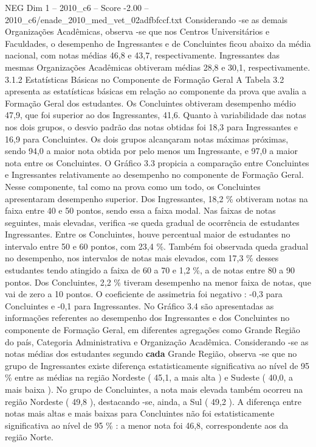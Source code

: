 \begin{textsample}{NEG Dim 1 – 2010\_c6 – Score -2.00 – 2010\_c6/enade\_2010\_med\_vet\_02adfbfccf.txt}
Considerando -se as demais Organizações Acadêmicas, observa -se que nos Centros Universitários e Faculdades, o desempenho de Ingressantes e de Concluintes ficou abaixo da média nacional, com notas médias 46,8 e 43,7, respectivamente.
Ingressantes das mesmas Organizações Acadêmicas obtiveram médias 28,8 e 30,1, respectivamente. 3.1.2 Estatísticas Básicas no Componente de Formação Geral A Tabela 3.2 apresenta as estatísticas básicas em relação ao componente da prova que avalia a Formação Geral dos estudantes.
Os Concluintes obtiveram desempenho médio 47,9, que foi superior ao dos Ingressantes, 41,6.
Quanto à variabilidade das notas nos dois grupos, o desvio padrão das notas obtidas foi 18,3 para Ingressantes e 16,9 para Concluintes.
Os dois grupos alcançaram notas máximas próximas, sendo 94,0 a maior nota obtida por pelo menos um Ingressante, e 97,0 a maior nota entre os Concluintes.
O Gráfico 3.3 propicia a comparação entre Concluintes e Ingressantes relativamente ao desempenho no componente de Formação Geral.
Nesse componente, tal como na prova como um todo, os Concluintes apresentaram desempenho superior.
Dos Ingressantes, 18,2 \% obtiveram notas na faixa entre 40 e 50 pontos, sendo essa a faixa modal.
Nas faixas de notas seguintes, mais elevadas, verifica -se queda gradual de ocorrência de estudantes Ingressantes.
Entre os Concluintes, houve percentual maior de estudantes no intervalo entre 50 e 60 pontos, com 23,4 \%.
Também foi observada queda gradual no desempenho, nos intervalos de notas mais elevados, com 17,3 \% desses estudantes tendo atingido a faixa de 60 a 70 e 1,2 \%, a de notas entre 80 a 90 pontos.
Dos Concluintes, 2,2 \% tiveram desempenho na menor faixa de notas, que vai de zero a 10 pontos.
O coeficiente de assimetria foi negativo : -0,3 para Concluintes e -0,1 para Ingressantes.
No Gráfico 3.4 são apresentadas as informações referentes ao desempenho dos Ingressantes e dos Concluintes no componente de Formação Geral, em diferentes agregações como Grande Região do país, Categoria Administrativa e Organização Acadêmica.
Considerando -se as notas médias dos estudantes segundo \textbf{cada} Grande Região, observa -se que no grupo de Ingressantes existe diferença estatisticamente significativa ao nível de 95 \% entre as médias na região Nordeste ( 45,1, a mais alta ) e Sudeste ( 40,0, a mais baixa ).
No grupo de Concluintes, a nota mais elevada também ocorreu na região Nordeste ( 49,8 ), destacando -se, ainda, a Sul ( 49,2 ).
A diferença entre notas mais altas e mais baixas para Concluintes não foi estatisticamente significativa ao nível de 95 \% : a menor nota foi 46,8, correspondente aos da região Norte.

\end{textsample}
